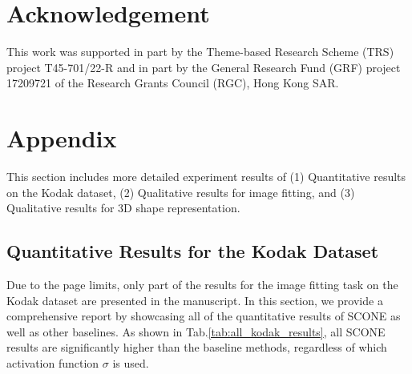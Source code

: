 \documentclass[letterpaper]{article} %
\begin{document}
\section{Acknowledgement}
This work was supported in part by the Theme-based Research Scheme (TRS) project T45-701/22-R and in part by the General Research Fund (GRF) project 17209721 of the Research Grants Council (RGC), Hong Kong SAR.

\clearpage



\clearpage
\onecolumn
\section{Appendix}
This section includes more detailed experiment results of (1) Quantitative results on the Kodak dataset, (2) Qualitative results for image fitting, and (3) Qualitative results for 3D shape representation.

\subsection{Quantitative Results for the Kodak Dataset}
Due to the page limits, only part of the results for the image fitting task on the Kodak dataset are presented in the manuscript. In this section, we provide a comprehensive report by showcasing all of the quantitative results of SCONE as well as other baselines. As shown in Tab.\ref{tab:all_kodak_results}, all SCONE results are significantly higher than the baseline methods, regardless of which activation function $\sigma$ is used.
\end{document}
